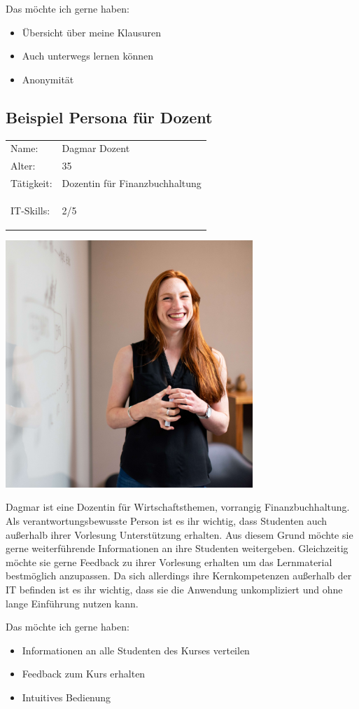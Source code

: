 Das möchte ich gerne haben:
\begin{itemize}
	\item Übersicht über meine Klausuren
	\item Auch unterwegs lernen können
	\item Anonymität
\end{itemize}

\subsection{Beispiel Persona für Dozent}
\begin{minipage}[t]{0.5\textwidth}
	\vspace{-4cm}
	\renewcommand{\arraystretch}{1.5}
	\begin{tabular}{l l}
		Name: & Dagmar Dozent \\
		Alter: & 35 \\
		Tätigkeit: & Dozentin für Finanzbuchhaltung \\
		IT-Skills: & 2/5 \hspace{-1cm} \begin{barchart}{5.0}
			\baritemNL{}{4}
		\end{barchart} \\
	\end{tabular}
\end{minipage}
\hfill
\begin{minipage}[t]{0.4\textwidth}
	\flushright
	\includegraphics[width=0.70\textwidth]{img/thisisengineering-raeng-TXxiFuQLBKQ-unsplash.jpg}
\end{minipage}

Dagmar ist eine Dozentin für Wirtschaftsthemen, vorrangig Finanzbuchhaltung.
Als verantwortungsbewusste Person ist es ihr wichtig, dass Studenten auch außerhalb ihrer Vorlesung Unterstützung erhalten.
Aus diesem Grund möchte sie gerne weiterführende Informationen an ihre Studenten weitergeben.
Gleichzeitig möchte sie gerne Feedback zu ihrer Vorlesung erhalten um das Lernmaterial bestmöglich anzupassen.
Da sich allerdings ihre Kernkompetenzen außerhalb der IT befinden ist es ihr wichtig, dass sie die Anwendung unkompliziert und ohne lange Einführung nutzen kann. 


Das möchte ich gerne haben:
\begin{itemize}
	\item Informationen an alle Studenten des Kurses verteilen
	\item Feedback zum Kurs erhalten
	\item Intuitives Bedienung
\end{itemize}
